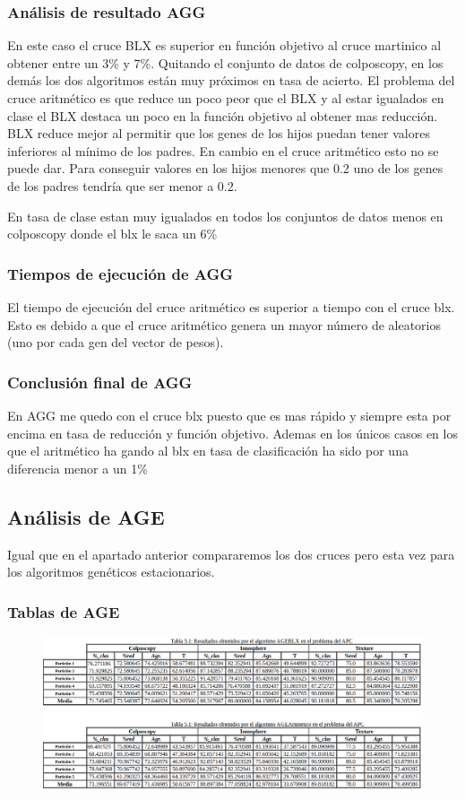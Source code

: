 \documentclass[titlepage]{article}
\begin{document}
	\subsubsection{Análisis de resultado AGG}
	En este caso el cruce BLX  es superior en función objetivo al cruce martinico al obtener entre un 3\% y 7\%. Quitando el conjunto de datos de colposcopy, en los demás los dos algoritmos están muy próximos en tasa de acierto. El problema del cruce aritmético es que reduce un poco peor que el BLX y al estar igualados en clase el BLX destaca un poco en la función objetivo al obtener mas reducción. BLX reduce mejor al permitir que los genes de los hijos puedan tener valores inferiores al mínimo de los padres. En cambio en el cruce aritmético esto no se puede dar. Para conseguir valores en los hijos menores que 0.2 uno de los genes de los padres tendría que ser menor a 0.2.
	
	En tasa de clase estan muy igualados en todos los conjuntos de datos menos en colposcopy donde el blx le saca un 6\%
	\subsubsection{Tiempos de ejecución de AGG}
	El tiempo de ejecución del cruce aritmético es superior a tiempo con el cruce blx. Esto es debido a que el cruce aritmético genera un mayor número de aleatorios (uno por cada gen del vector de pesos).
	\subsubsection{Conclusión final de AGG}
	En AGG me quedo con el cruce blx puesto que es mas rápido y siempre esta por encima en tasa de reducción y función objetivo. Ademas en los únicos casos en los que el aritmético ha gando al blx en tasa de clasificación ha sido por una diferencia menor a un 1\%
	
	\subsection{Análisis de AGE}
	Igual que en el apartado anterior compararemos los dos cruces pero esta vez para los algoritmos genéticos estacionarios.
	
	\subsubsection{Tablas de AGE}
	\begin{figure}[H]
		\centering
		\includegraphics[width=1\linewidth]{screenshot006}
		\caption{}
		\label{fig:screenshot006}
	\end{figure}
	
\end{document}
